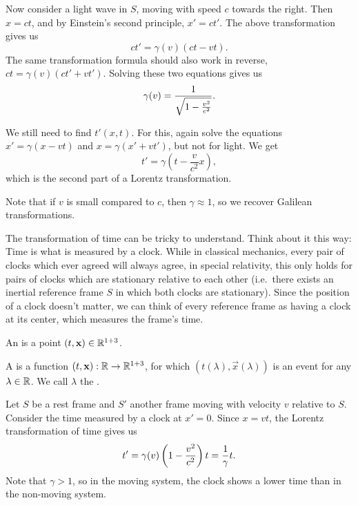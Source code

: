 Now consider a light wave in $S$, moving with speed $c$ towards the right.
Then $x = ct$, and by Einstein's second principle, $x' = ct'$.
The above transformation gives us
\[
  ct' = \gamma(v) (ct - vt).
\]
The same transformation formula should also work in reverse, $ct = \gamma(v)
(ct' + vt')$.
Solving these two equations gives us
\[
  \gamma(v) = \frac{1}{\sqrt{1 - \frac{v^2}{c^2}}}.
\]

We still need to find $t'(x, t)$.
For this, again solve the equations $x' = \gamma (x - vt)$ and $x = \gamma (x' +
v t')$, but not for light.
We get
\[
  t' = \gamma (t - \frac{v}{c^2} x),
\]
which is the second part of a Lorentz transformation.

\begin{remark}
  Note that if $v$ is small compared to $c$, then $\gamma \approx 1$, so we
  recover Galilean transformations.
\end{remark}

\begin{remark}
  The transformation of time can be tricky to understand.
  Think about it this way:
  Time is what is measured by a clock.
  While in classical mechanics, every pair of clocks which ever agreed will
  always agree, in special relativity, this only holds for pairs of clocks which
  are stationary relative to each other (i.e.~there exists an inertial reference
  frame $S$ in which both clocks are stationary).
  Since the position of a clock doesn't matter, we can think of every reference
  frame as having a clock at its center, which measures the frame's time.
\end{remark}

\begin{definition}
  An  is a point $(t, \mathbf{x}) \in \mathbb{R}^{1+3}$.
\end{definition}

\begin{definition}
  A  is a function $(t, \mathbf{x}): \mathbb{R} \to \mathbb{R}^{1+3}$, for which
  $(t(\lambda), \vec{x}(\lambda))$ is an event for any $\lambda \in \mathbb{R}$.
  We call $\lambda$ the .
\end{definition}

\begin{example}
  Let $S$ be a rest frame and $S'$ another frame moving with velocity $v$
  relative to $S$.
  Consider the time measured by a clock at $x' = 0$.
  Since $x = vt$, the Lorentz transformation of time gives us
  \[
	t' = \gamma(v) \left(1 - \frac{v^2}{c^2} \right) t
	= \frac{1}{\gamma} t.
  \]
  Note that $\gamma > 1$, so in the moving system, the clock shows a lower time
  than in the non-moving system.
\end{example}

